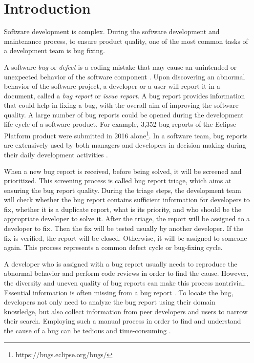 \section{Introduction}
Software development is complex. During the software development and maintenance process, to ensure product quality, one of the most common tasks of a development team is bug fixing.

A software \textit{bug} or \textit{defect} is a coding mistake that may cause an unintended or unexpected behavior of the software component \cite{Bruegge:2009:OSE:1795808}. Upon discovering an abnormal behavior of the software project, a developer or a user will report it in a document, called a \textit{bug report} or \textit{issue report}. A bug report provides information that could help in fixing a bug, with the overall aim of improving the software quality. A large number of bug reports could be opened during the development life-cycle of a software product. For example, 3,352 bug reports of the Eclipse Platform product were submitted in 2016 alone\footnote{https://bugs.eclipse.org/bugs/}. In a software team, bug reports are extensively used by both managers and developers in decision making during their daily development activities \cite{Buse:2012:INS:2337223.2337343}. 

When a new bug report is received, before being solved, it will be screened and prioritized. This screening process is called bug report triage, which aims at ensuring the bug report quality. During the triage steps, the development team will check whether the bug report contains sufficient information for developers to fix, whether it is a duplicate report, what is its priority, and who should be the appropriate developer to solve it. After the triage, the report will be assigned to a developer to fix. Then the fix will be tested usually by another developer. If the fix is verified, the report will be closed. Otherwise, it will be assigned to someone again. This process represents a common defect cycle or bug-fixing cycle.

A developer who is assigned with a bug report usually needs to reproduce the abnormal behavior \cite{LaToza:2010:HQC:1937117.1937125} and perform code reviews \cite{Bacchelli:2013:EOC:2486788.2486882} in order to find the cause. However, the diversity and uneven quality of bug reports can make this process nontrivial. Essential information is often missing from a bug report \cite{Breu:2010:INB:1718918.1718973}. To locate the bug, developers not only need to analyze the bug report using their domain knowledge, but also collect information from peer developers and users to narrow their search. Employing such a manual process in order to find and understand the cause of a bug can be tedious and time-consuming \cite{Murphy-Hill:2013:DBF:2486788.2486833}. 

